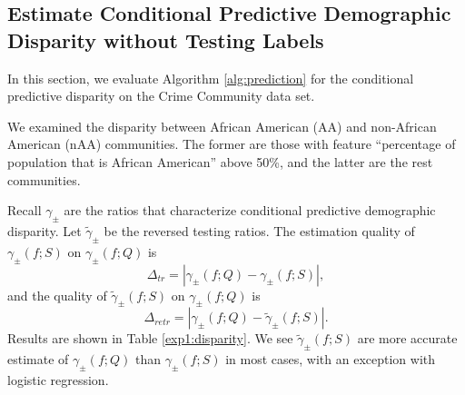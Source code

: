 \subsection{Estimate Conditional Predictive Demographic Disparity without Testing Labels} 

In this section, we evaluate Algorithm \ref{alg:prediction} 
for the conditional predictive disparity on the Crime 
Community data set. 

We examined the disparity between African American (AA) 
and non-African American  (nAA) communities. The former 
are those with feature ``percentage of population that 
is African American'' above 50\%, and the latter 
are the rest communities. 

Recall $\gamma_{\pm}$ are the ratios 
that characterize conditional predictive demographic 
disparity. Let $\tilde{\gamma}_{\pm}$ be the reversed 
testing ratios. The estimation quality of 
$\gamma_{\pm}(f; S)$ on $\gamma_{\pm}(f; Q)$ is 
\begin{equation}
\Delta_{tr} = | \gamma_{\pm}(f; Q) - \gamma_{\pm}(f; S)|, 
\end{equation}
and the quality of $\tilde{\gamma}_{\pm}(f; S)$ 
on $\gamma_{\pm}(f; Q)$ is 
\begin{equation}
\Delta_{retr} = | \gamma_{\pm}(f; Q) 
- \tilde{\gamma}_{\pm}(f; S)|.  
\end{equation}
Results are shown in Table \ref{exp1:disparity}.  
We see $\tilde{\gamma}_{\pm}(f; S)$ are 
more accurate estimate of $\gamma_{\pm}(f; Q)$ 
than $\gamma_{\pm}(f; S)$ in most cases, with 
an exception with logistic regression. 





